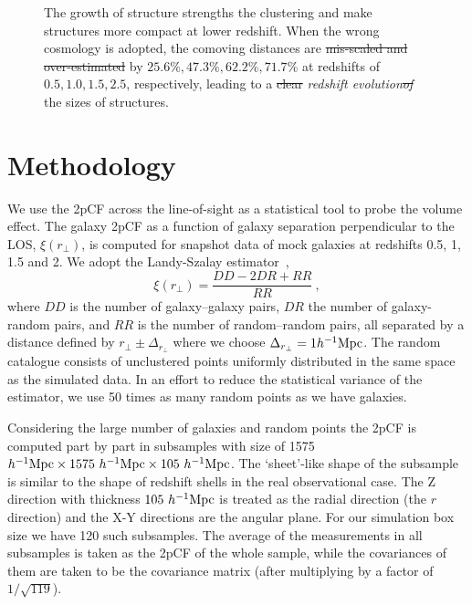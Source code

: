 \documentclass[iop]{emulateapj}
\providecommand{\DIFadd}[1]{{\protect\color{blue}\uwave{#1}}} %
\providecommand{\DIFdel}[1]{{\protect\color{red}\sout{#1}}}                      %
\providecommand{\DIFaddFL}[1]{\DIFadd{#1}} %
\providecommand{\DIFdelFL}[1]{\DIFdel{#1}} %
\providecommand{\DIFaddbeginFL}{} %
\providecommand{\DIFaddendFL}{} %
\providecommand{\DIFdelbeginFL}{} %
\providecommand{\DIFdelendFL}{} %
\begin{document}
\begin{figure}
{  The growth of structure strengths the clustering and make structures more compact at lower redshift.
  When the wrong cosmology is adopted, the comoving distances are \DIFdelbeginFL \DIFdelFL{mis-scaled and over-estimated }\DIFdelendFL \DIFaddbeginFL \DIFaddFL{up-scaled }\DIFaddendFL by $25.6\%,47.3\%,62.2\%,71.7\%$ at redshifts of \DIFdelbeginFL \DIFdelFL{$0.5,1.0,1.5,2.5$}\DIFdelendFL \DIFaddbeginFL \DIFaddFL{$0.5,1,1.5,2$}\DIFaddendFL , respectively, leading to a \DIFdelbeginFL \DIFdelFL{clear }\DIFdelendFL \DIFaddbeginFL {\it \DIFaddendFL redshift evolution\DIFdelbeginFL \DIFdelFL{of }\DIFdelendFL \DIFaddbeginFL } \DIFaddFL{in }\DIFaddendFL the sizes of structures.
   }
\end{figure}

\section{Methodology}


We use the 2pCF across the line-of-sight as a statistical tool to probe the volume effect.
The galaxy 2pCF as a function of galaxy separation perpendicular to the LOS, $\xi(r_\perp)$, is computed for snapshot data of mock galaxies at redshifts 0.5, 1, 1.5 and 2.
We adopt the Landy-Szalay estimator~\citep{1993ApJ...412...64L},
\begin{equation}
\xi(r_\perp)=\frac{DD-2DR+RR}{RR}\ ,
\end{equation}
where $DD$ is the number of galaxy--galaxy pairs, 
$DR$ the number of galaxy-random pairs, 
and $RR$ is the number of random--random pairs, 
all separated by a distance defined by $r_\perp\pm\Delta_{r_\perp}$ where we choose $\Delta_{r_\perp}=1h^{-1}\rm Mpc$.
The random catalogue consists of unclustered points uniformly distributed in the same space as the simulated data. 
In an effort to reduce the statistical variance of the estimator, we use 50 times as many random points as we have galaxies.

Considering the large number of galaxies and random points the 2pCF is computed part by part in subsamples with 
size of 1575 $h^{-1}{\rm Mpc}\times 1575\ h^{-1}{\rm Mpc}\times 105\ h^{-1}{\rm Mpc}$.
The `sheet'-like shape of the subsample is similar to the shape of redshift shells in the real observational case.
The Z direction with thickness $105\ h^{-1}\rm Mpc$ is treated as the radial direction (the $r$ direction) 
and the X-Y directions %
are the angular plane.
For our simulation box size we have 120 such subsamples.
The average of the measurements in all subsamples is taken as the 2pCF of the whole sample,
while the covariances of them are taken to be the covariance matrix (after multiplying by a factor of $1/\sqrt{119}$).
\end{document}
